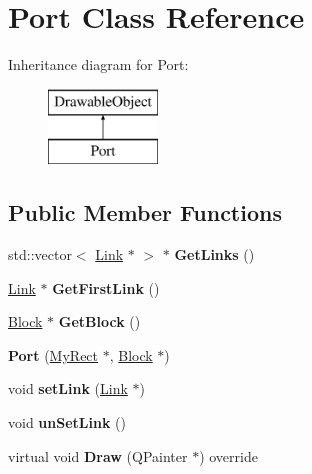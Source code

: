 \hypertarget{classPort}{}\section{Port Class Reference}
\label{classPort}
Inheritance diagram for Port\+:\begin{figure}[H]
\begin{center}
\leavevmode
\includegraphics[height=2.000000cm]{classPort}
\end{center}
\end{figure}
\subsection*{Public Member Functions}
\begin{DoxyCompactItemize}
\item 
\mbox{\label{classPort_a2771ea55321da837962228239ad197f4}} 
std\+::vector$<$ \hyperlink{classLink}{Link} $\ast$ $>$ $\ast$ {\bfseries Get\+Links} ()
\item 
\mbox{\label{classPort_a0b838caaae907fe43e56ff04b436c97c}} 
\hyperlink{classLink}{Link} $\ast$ {\bfseries Get\+First\+Link} ()
\item 
\mbox{\label{classPort_a0ff11c23aa812617436f1126c151d925}} 
\hyperlink{classBlock}{Block} $\ast$ {\bfseries Get\+Block} ()
\item 
\mbox{\label{classPort_add0c27342525c4ed3cd20d5e52fd909c}} 
{\bfseries Port} (\hyperlink{classMyRect}{My\+Rect} $\ast$, \hyperlink{classBlock}{Block} $\ast$)
\item 
\mbox{\label{classPort_a0c68cc80e2e2e53812a6a9abc0538a07}} 
void {\bfseries set\+Link} (\hyperlink{classLink}{Link} $\ast$)
\item 
\mbox{\label{classPort_a1d0354af65122fd5305c6c884063b9e3}} 
void {\bfseries un\+Set\+Link} ()
\item 
\mbox{\label{classPort_ad6258dd46cdd965aa9488dbb69a91c4a}} 
virtual void {\bfseries Draw} (Q\+Painter $\ast$) override
\end{DoxyCompactItemize}
